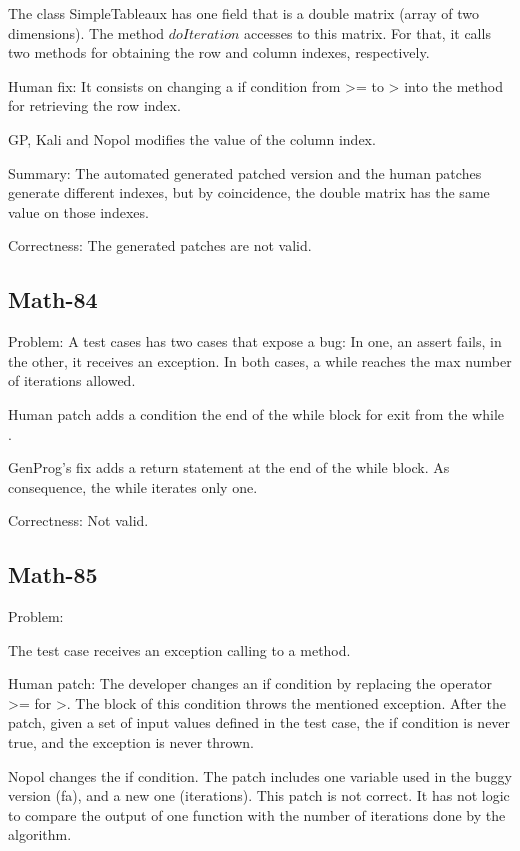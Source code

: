 \documentclass{article}
\begin{document}
The class SimpleTableaux has one field that is a double matrix (array of two dimensions).
The method $doIteration$ accesses to this matrix. For that, it calls two methods for obtaining the row and column indexes, respectively.

Human fix: 
It consists on changing a if condition from >= to > into the method for retrieving the row index.

GP, Kali and Nopol modifies the value of the column index. 

Summary:
The automated generated patched version and the human patches generate  different indexes, but by coincidence, the double matrix has the same value on those indexes.

Correctness:
The generated patches are not valid.

\subsection{Math-84}

Problem:
A test cases has two cases that expose a bug:
In one, an assert fails, in the other, it receives an exception.
In both cases, a while reaches the max number of iterations allowed. 

Human patch adds a condition the end of the while block for exit from the while .

GenProg's fix adds a return statement at the end of the while block. 
As consequence, the while iterates only one.

Correctness:
Not valid.

\subsection{Math-85}

Problem:

The test case receives an exception calling to a method.

Human patch: 
The developer changes an if condition by replacing the operator >= for >. The block of this condition throws the mentioned exception.
After the patch, given a set of input values defined in the test case, the if condition is never true, and the exception is never thrown.

Nopol changes the if condition. The patch includes one variable used in the buggy version (fa), and a new one (iterations). This patch is not correct. It has not logic to compare the output of one function with the number of iterations done by the algorithm.
\end{document}
